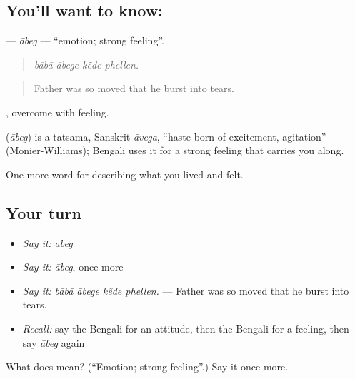 \subsection*{You'll want to know: }
\textbf{} — \emph{ābeg} — \textquotedblleft{}emotion; strong feeling\textquotedblright{}.

\begin{quote}
   
\end{quote}

\begin{quote}
\emph{bābā ābege kẽde phellen.}
\end{quote}

\begin{quote}
Father was so moved that he burst into tears.
\end{quote}

, overcome with feeling.

\begin{cousinweb}
\textbf{} (\emph{ābeg}) is a tatsama, Sanskrit \emph{āvega}, \textquotedblleft{}haste born of excitement, agitation\textquotedblright{} (Monier-Williams); Bengali uses it for a strong feeling that carries you along.
\end{cousinweb}

\begin{grammarlens}[title={What you've built}]
One more word for describing what you lived and felt.
\end{grammarlens}

\subsection*{Your turn}
\begin{itemize}
\raggedright
  \item \emph{Say it:} \emph{ābeg}
  \item \emph{Say it:} \emph{ābeg}, once more
  \item \emph{Say it:} \emph{bābā ābege kẽde phellen.} — Father was so moved that he burst into tears.
  \item \emph{Recall:} say the Bengali for an attitude, then the Bengali for a feeling, then say \emph{ābeg} again
\end{itemize}

\begin{tcolorbox}[breakable,colback=teal!4,colframe=teal!35!black,title={Before you move on}]
What does  mean? (\textquotedblleft{}Emotion; strong feeling\textquotedblright{}.) Say it once more.
\end{tcolorbox}
